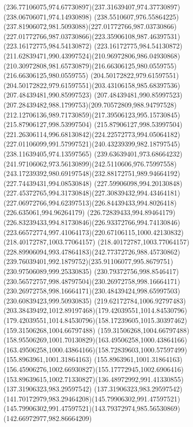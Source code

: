 {    \curveto(236.77106075,974.67730897)(237.31639407,974.37730897)(238.06706071,974.14930898)
    \curveto(238.5510607,976.55864225)(237.81906072,981.5093088)(227.01772766,987.03730866)
    \curveto(227.01772766,987.03730866)(223.35906108,987.46397531)(223.16172775,984.54130872)
    \curveto(223.16172775,984.54130872)(211.62839471,990.43997524)(210.96972806,986.04930868)
    \curveto(210.30972808,981.65730879)(216.66306125,980.0559755)(216.66306125,980.0559755)
    \lineto(204.50172822,979.61597551)
    \curveto(204.50172822,979.61597551)(203.43106158,985.68397536)(207.48439481,990.85997523)
    \curveto(207.48439481,990.85997523)(207.28439482,988.1799753)(209.70572809,988.94797528)
    \curveto(212.12706136,989.71730859)(217.39506123,995.15730845)(215.87906127,998.53997504)
    \curveto(215.87906127,998.53997504)(221.26306114,996.68130842)(224.22572773,994.05064182)
    \curveto(227.01106099,991.57997521)(240.43239399,982.18797545)(238.11639405,974.13597565)
    \curveto(239.63639401,973.68664232)(241.97106062,973.56130899)(242.5110606,976.75997558)
    \curveto(243.17239392,980.69197548)(232.88172751,989.94664192)(227.74439431,994.08530848)
    \curveto(227.59906098,994.20130848)(227.45372765,994.31730848)(227.30839432,994.43464181)
    \curveto(227.06972766,994.62397513)(226.84439433,994.8026418)(226.635061,994.96264179)
    \curveto(226.72839433,994.89464179)(226.83239433,994.81730846)(226.93372766,994.74130846)
    \curveto(223.66572774,997.41064173)(220.67106115,1000.42130832)(218.40172787,1003.77064157)
    \curveto(218.40172787,1003.77064157)(228.89906094,993.47864183)(242.77372726,988.45730862)
    \curveto(239.76039401,992.1879752)(235.91106077,995.8679751)(230.97506089,999.25330835)
    \curveto(230.79372756,998.8546417)(230.56572757,998.48797504)(230.26972758,998.16664171)
    \curveto(230.26972758,998.16664171)(230.48439424,998.65997503)(230.60839423,999.50930835)
    \curveto(219.62172784,1006.92797483)(203.38439492,1012.89197468)(179.42039551,1014.84530796)
    \curveto(179.42039551,1014.84530796)(158.17239605,1015.30397462)(159.31506268,1004.66797488)
    \curveto(159.31506268,1004.66797488)(158.95506269,1001.70130829)(163.49506258,1000.43864166)
    \curveto(163.49506258,1000.43864166)(158.72839603,1000.57597499)(155.8963961,1001.31864163)
    \curveto(155.8963961,1001.31864163)(156.45906276,1002.66930827)(155.17772945,1002.6906416)
    \curveto(153.89639615,1002.71330827)(136.48972992,991.41330855)(137.31906323,983.29597542)
    \curveto(137.31906323,983.29597542)(141.70172979,983.29464208)(145.79906302,991.47597521)
    \curveto(145.79906302,991.47597521)(143.79372974,985.56530869)(142.66972977,982.86664209)
}
